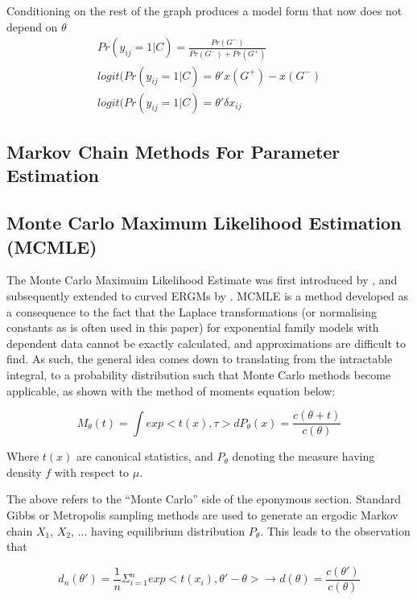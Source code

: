 Conditioning on the rest of the graph produces a model form that now does not depend on $\theta$
\begin{equation}
\begin{aligned}
    Pr(y_{ij} = 1|C) = \frac{Pr(G^-)}{Pr(G^-) + Pr(G^+)} \\
    logit(Pr(y_{ij} = 1|C) = \theta'{x(G^+) - x(G^-)} \\
    \label{eqn:ergm_no_theta}
    logit(Pr(y_{ij} = 1|C) = \theta'\delta x_{ij}
\end{aligned}
\end{equation}

\subsection{Markov Chain Methods For Parameter Estimation}

\subsection{Monte Carlo Maximum Likelihood Estimation (MCMLE)}

The Monte Carlo Maximuim Likelihood Estimate was first introduced by \cite{geyerthompson1992}, and subsequently extended to curved ERGMs by \cite{hunterhandcock2006}. MCMLE is a method developed as a consequence to the fact that the  Laplace transformations (or normalising constants as is often used in this paper) for exponential family models with dependent data cannot be exactly calculated, and approximations are difficult to find. As such, the general idea comes down to translating from the intractable integral, to a probability distribution such that Monte Carlo methods become applicable, as shown with the method of moments equation below:

\begin{equation}
M_\theta(t) = \int{exp<t(x), \tau>}dP_\theta(x) = \frac{c(\theta + t)}{c(\theta)}
\end{equation}

Where $t(x)$ are canonical statistics, and $P_\theta$ denoting the measure having density $f$ with respect to $\mu$.

The above refers to the ``Monte Carlo'' side of the eponymous section. Standard Gibbs or Metropolis sampling methods are used to generate an ergodic Markov chain $X_1$, $X_2$, ... having equilibrium distribution $P_\theta$. This leads to the observation that

\begin{equation}
\label{eq:mcmle_importance_sampling}
d_n(\theta') =  \frac{1}{n}\Sigma_{i=1}^n exp{<t(x_i), \theta' - \theta>} \rightarrow d(\theta) = \frac{c(\theta')}{c(\theta)}
\end{equation}


